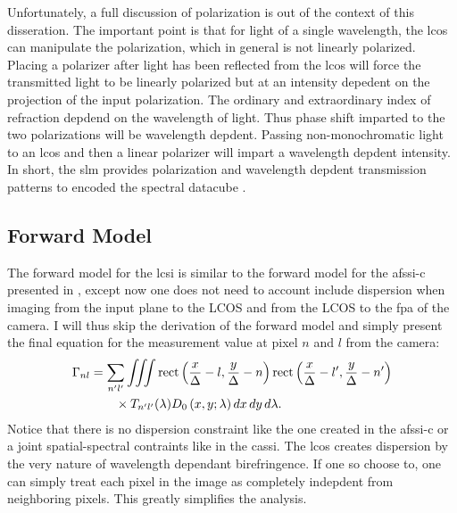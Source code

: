 



Unfortunately, a full discussion of polarization is out of the context of this disseration. The important point is that for light of a single wavelength, the \gls{lcos} can manipulate the polarization, which in general is not linearly polarized. Placing a polarizer after light has been reflected from the \gls{lcos} will force the transmitted light to be linearly polarized but at an intensity depedent on the projection of the input polarization. The ordinary and extraordinary index of refraction depdend on the wavelength of light. Thus phase shift imparted to the two polarizations will be wavelength depdent. Passing non-monochromatic light to an \gls{lcos} and then a linear polarizer will impart a wavelength depdent intensity. In short, the \gls{slm} provides polarization and wavelength depdent transmission patterns to encoded the spectral datacube \cite{tsai2015spatial}.


\subsection{Forward Model}

The forward model for the \gls{lcsi} is similar to the forward model for the \gls{afssi-c} presented in , except now one does not need to account include dispersion when imaging from the input plane to the LCOS and from the LCOS to the \gls{fpa} of the camera. I will thus skip the derivation of the forward model and simply present the final equation for the measurement value at pixel $n$ and $l$ from the camera:
%
\begin{align} 
	\Gamma_{nl} &= \sum_{n^\prime l^\prime} \iiint \mbox{rect} \left( \frac{x}{\Delta} - l, \frac{y}{\Delta} - n \right) \mbox{rect} \left( \frac{x}{\Delta} - l^\prime , \frac{y}{\Delta} - n^\prime \right) \notag \\
 	&\qquad \times T_{n^\prime l^\prime} \ap{\lambda} D_0 \left( x, y; \lambda \right) dx \, dy \, d\lambda.
\end{align}
%
Notice that there is no dispersion constraint like the one created in the \gls{afssi-c} or a joint spatial-spectral contraints like in the \gls{cassi}. The \gls{lcos} creates dispersion by the very nature of wavelength dependant birefringence. If one so choose to, one can simply treat each pixel in the image as completely indepdent from neighboring pixels. This greatly simplifies the analysis. 

